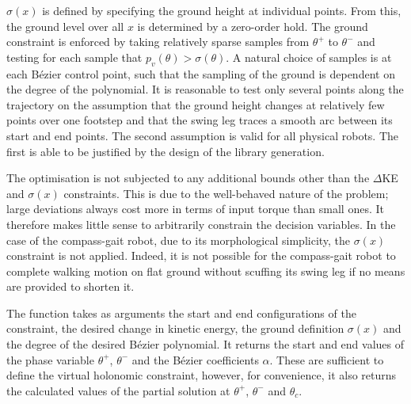 $\sigma(x)$ is defined by specifying the ground height at individual points. From this, the ground level over all $x$ is determined by a zero-order hold. The ground constraint is enforced by taking relatively sparse samples from $\theta^+$ to $\theta^-$ and testing for each sample that $p_v(\theta)>\sigma(\theta)$. A natural choice of samples is at each Bézier control point, such that the sampling of the ground is dependent on the degree of the polynomial. It is reasonable to test only several points along the trajectory on the assumption that the ground height changes at relatively few points over one footstep and that the swing leg traces a smooth arc between its start and end points. The second assumption is valid for all physical robots. The first is able to be justified by the design of the library generation.

The optimisation is not subjected to any additional bounds other than the $\Delta$KE and $\sigma(x)$ constraints. This is due to the well-behaved nature of the problem; large deviations always cost more in terms of input torque than small ones. It therefore makes little sense to arbitrarily constrain the decision variables. In the case of the compass-gait robot, due to its morphological simplicity, the $\sigma(x)$ constraint is not applied. Indeed, it is not possible for the compass-gait robot to complete walking motion on flat ground without scuffing its swing leg if no means are provided to shorten it.

The  function takes as arguments the start and end configurations of the constraint, the desired change in kinetic energy, the ground definition $\sigma(x)$ and the degree of the desired Bézier polynomial. It returns the start and end values of the phase variable $\theta^+$, $\theta^-$ and the Bézier coefficients $\alpha$. These are sufficient to define the virtual holonomic constraint, however, for convenience, it also returns the calculated values of the partial solution at $\theta^+$, $\theta^-$ and $\theta_c$.